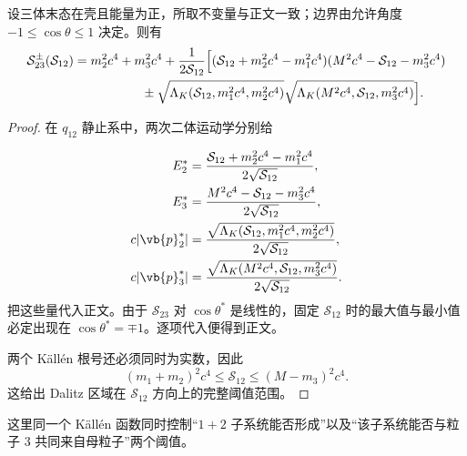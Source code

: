 \begin{proposition}
设三体末态在壳且能量为正，所取不变量与正文一致；边界由允许角度 $-1\le\cos\theta\le1$ 决定。则有
\begin{align}
 \mathcal S_{23}^{\pm}(\mathcal S_{12})
 ={}&m_2^2c^4+m_3^2c^4
 +\frac{1}{2\mathcal S_{12}}
 \Bigl[
 (\mathcal S_{12}+m_2^2c^4-m_1^2c^4)
 (M^2c^4-\mathcal S_{12}-m_3^2c^4)
 \nonumber\\
 &\qquad\qquad
 \pm
 \sqrt{\Lambda_K(\mathcal S_{12},m_1^2c^4,m_2^2c^4)}
 \sqrt{\Lambda_K(M^2c^4,\mathcal S_{12},m_3^2c^4)}
 \Bigr].
\label{eq:dalitz-boundary-dp52}
\end{align}
\end{proposition}
\begin{proof}
在 $q_{12}$ 静止系中，两次二体运动学分别给

\begin{align*}
E_2^*
&=\frac{\mathcal S_{12}+m_2^2c^4-m_1^2c^4}{2\sqrt{\mathcal S_{12}}},\\
E_3^*
&=\frac{M^2c^4-\mathcal S_{12}-m_3^2c^4}{2\sqrt{\mathcal S_{12}}},\\
c|\vb{p}_2^*|
&=\frac{\sqrt{\Lambda_K(\mathcal S_{12},m_1^2c^4,m_2^2c^4)}}{2\sqrt{\mathcal S_{12}}},\\
c|\vb{p}_3^*|
&=\frac{\sqrt{\Lambda_K(M^2c^4,\mathcal S_{12},m_3^2c^4)}}{2\sqrt{\mathcal S_{12}}}.
\end{align*}
把这些量代入正文。由于 $\mathcal S_{23}$ 对 $\cos\theta^*$ 是线性的，固定 $\mathcal S_{12}$ 时的最大值与最小值必定出现在 $\cos\theta^*=\mp1$。逐项代入便得到正文。

两个 Källén 根号还必须同时为实数，因此
\begin{equation*}
(m_1+m_2)^2c^4
\le\mathcal S_{12}
\le(M-m_3)^2c^4.
\end{equation*}
这给出 Dalitz 区域在 $\mathcal S_{12}$ 方向上的完整阈值范围。
\end{proof}

这里同一个 K\"all\'en 函数同时控制“$1+2$ 子系统能否形成”以及“该子系统能否与粒子 3 共同来自母粒子”两个阈值。


